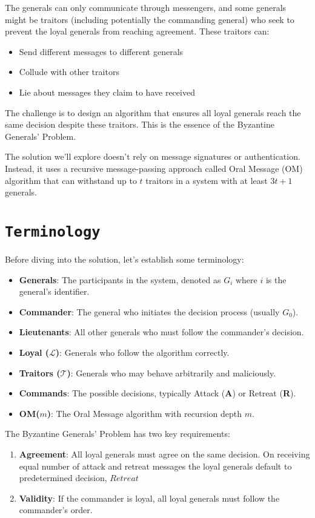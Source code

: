 \documentclass[11pt]{article}
\begin{document}
The generals can only communicate through messengers, and some generals might be traitors (including potentially the commanding general) who seek to prevent the loyal generals from reaching agreement. These traitors can:
\begin{itemize}
    \item Send different messages to different generals
    \item Collude with other traitors
    \item Lie about messages they claim to have received
\end{itemize}

The challenge is to design an algorithm that ensures all loyal generals reach the same decision despite these traitors. This is the essence of the Byzantine Generals' Problem.

The solution we'll explore doesn't rely on message signatures or authentication. Instead, it uses a recursive message-passing approach called Oral Message (OM) algorithm that can withstand up to $t$ traitors in a system with at least $3t+1$ generals.

\section*{\texttt{\Large Terminology}}
\justifying
Before diving into the solution, let's establish some terminology:

\begin{itemize}
    \item \textbf{Generals}: The participants in the system, denoted as $G_i$ where $i$ is the general's identifier.
    \item \textbf{Commander}: The general who initiates the decision process (usually $G_0$).
    \item \textbf{Lieutenants}: All other generals who must follow the commander's decision.
    \item \textbf{Loyal ($\mathcal{L}$)}: Generals who follow the algorithm correctly.
    \item \textbf{Traitors ($\mathcal{T}$)}: Generals who may behave arbitrarily and maliciously.
    \item \textbf{Commands}: The possible decisions, typically Attack (\textbf{A}) or Retreat (\textbf{R}).
    \item \textbf{OM($m$)}: The Oral Message algorithm with recursion depth $m$.
\end{itemize}

The Byzantine Generals' Problem has two key requirements:
\begin{enumerate}
    \item \textbf{Agreement}: All loyal generals must agree on the same decision. On receiving equal number of attack and retreat messages the loyal generals default to predetermined decision, $Retreat$
    \item \textbf{Validity}: If the commander is loyal, all loyal generals must follow the commander's order.
\end{enumerate}
\end{document}
